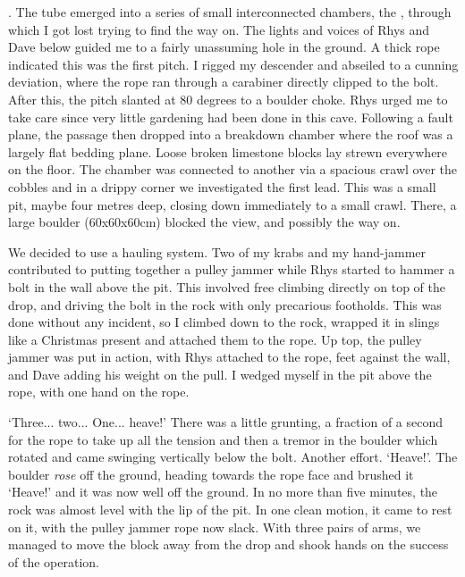 	. The tube emerged into a series of small interconnected chambers, the , through which I got lost trying to find the way on. The lights and voices of Rhys and Dave below guided me to a fairly unassuming hole in the ground. A thick rope indicated this was the first pitch. I rigged my descender and abseiled to a cunning deviation, where the rope ran through a carabiner directly clipped to the bolt. After this, the pitch slanted at 80 degrees to a boulder choke. Rhys urged me to take care since very little gardening had been done in this cave. Following a fault plane, the passage then dropped into a breakdown chamber where the roof was a largely flat bedding plane. Loose broken limestone blocks lay strewn everywhere on the floor. The chamber was connected to another via a spacious crawl over the cobbles and in a drippy corner we investigated the first lead. This was a small pit, maybe four metres deep, closing down immediately to a small crawl. There, a large boulder (60x60x60cm) blocked the view, and possibly the way on.

	We decided to use a hauling system. Two of my krabs and my hand-jammer contributed to putting together a pulley jammer while Rhys started to hammer a bolt in the wall above the pit. This involved free climbing directly on top of the drop, and driving the bolt in the rock with only precarious footholds. This was done without any incident, so I climbed down to the rock, wrapped it in slings like a Christmas present and attached them to the rope. Up top, the pulley jammer was put in action, with Rhys attached to the rope, feet against the wall, and Dave adding his weight on the pull. I wedged myself in the pit above the rope, with one hand on the rope.

	`Three... two... One... heave!' There was a little grunting, a fraction of a second  for the rope to take up all the tension and then a tremor in the boulder which rotated and came swinging vertically below the bolt. Another effort. `Heave!'. The boulder \emph{rose} off the ground, heading towards the rope face and brushed it `Heave!' and it was now well off the ground. In no more than five minutes, the rock was almost level with the lip of the pit. In one clean motion, it came to rest on it, with the pulley jammer rope now slack. With three pairs of arms, we managed to move the block away from the drop and shook hands on the success of the operation.

